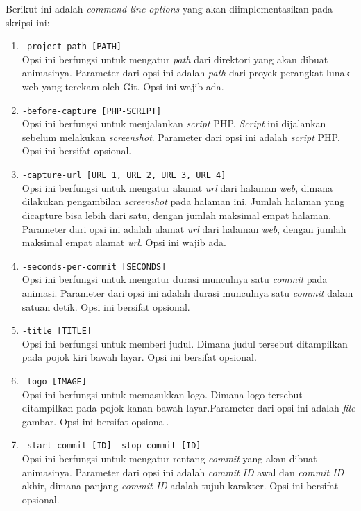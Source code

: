 Berikut ini adalah \textit{command line options} yang akan diimplementasikan pada skripsi ini:
\begin{enumerate}
\item \texttt{-project-path [PATH]}\\
Opsi ini berfungsi untuk mengatur \textit{path} dari direktori yang akan dibuat animasinya. Parameter dari opsi ini adalah \textit{path} dari proyek perangkat lunak web yang terekam oleh Git. Opsi ini wajib ada.

\item \texttt{-before-capture [PHP-SCRIPT]}\\
Opsi ini berfungsi untuk menjalankan \textit{script} PHP. \textit{Script} ini dijalankan sebelum melakukan \textit{screenshot}. Parameter dari opsi ini adalah \textit{script} PHP. Opsi ini bersifat opsional.

\item \texttt{-capture-url [URL 1, URL 2, URL 3, URL 4]}\\
Opsi ini berfungsi untuk mengatur alamat \textit{url} dari halaman \textit{web}, dimana dilakukan pengambilan \textit{screenshot} pada halaman ini. Jumlah halaman yang dicapture bisa lebih dari satu, dengan jumlah maksimal empat halaman. Parameter dari opsi ini adalah alamat \textit{url} dari halaman \textit{web}, dengan jumlah maksimal empat alamat \textit{url}. Opsi ini wajib ada.

\item \texttt{-seconds-per-commit [SECONDS]}\\
Opsi ini berfungsi untuk mengatur durasi munculnya satu \textit{commit} pada animasi. Parameter dari opsi ini adalah durasi munculnya satu \textit{commit} dalam satuan detik. Opsi ini bersifat opsional.

\item \texttt{-title [TITLE]}\\
Opsi ini berfungsi untuk memberi judul. Dimana judul tersebut ditampilkan pada pojok kiri
bawah layar. Opsi ini bersifat opsional. 

\item \texttt{-logo [IMAGE]}\\
Opsi ini berfungsi untuk memasukkan logo. Dimana logo tersebut ditampilkan pada pojok kanan
bawah layar.Parameter dari opsi ini adalah \textit{file} gambar. Opsi ini bersifat opsional.

\item \texttt{-start-commit [ID] -stop-commit [ID]}\\
Opsi ini berfungsi untuk mengatur rentang \textit{commit} yang akan dibuat animasinya. Parameter dari opsi ini adalah \textit{commit ID} awal dan \textit{commit ID} akhir, dimana panjang \textit{commit ID} adalah tujuh karakter. Opsi ini bersifat opsional. 
\end{enumerate}

